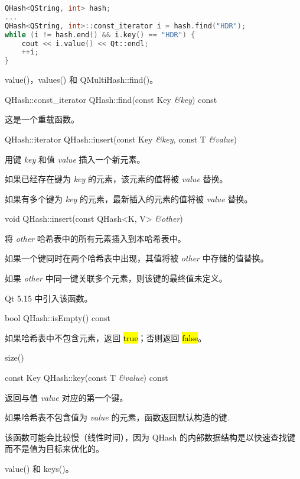 \begin{lstlisting}[language=C++]
QHash<QString, int> hash;
...
QHash<QString, int>::const_iterator i = hash.find("HDR");
while (i != hash.end() && i.key() == "HDR") {
    cout << i.value() << Qt::endl;
    ++i;
}
\end{lstlisting}

\begin{notice}[另请参阅]
value()，values() 和 QMultiHash::find()。
\end{notice}

QHash::const\_iterator QHash::find(const Key \emph{\&key}) const

这是一个重载函数。

QHash::iterator QHash::insert(const Key \emph{\&key}, const T \emph{\&value})

用键 \emph{key} 和值 \emph{value} 插入一个新元素。

如果已经存在键为 \emph{key} 的元素，该元素的值将被 \emph{value} 替换。

如果有多个键为 \emph{key} 的元素，最新插入的元素的值将被 \emph{value }替换。

void QHash::insert(const QHash<K, V> \emph{\&other})

将 \emph{other} 哈希表中的所有元素插入到本哈希表中。

如果一个键同时在两个哈希表中出现，其值将被 \emph{other} 中存储的值替换。

\begin{notice}
如果 \emph{other} 中同一键关联多个元素，则该键的最终值未定义。
\end{notice}

Qt 5.15 中引入该函数。

bool QHash::isEmpty() const

如果哈希表中不包含元素，返回 \hl{true}；否则返回 \hl{false}。

\begin{notice}[另请参阅]
size()
\end{notice}

const Key QHash::key(const T \emph{\&value}) const

返回与值 \emph{value} 对应的第一个键。

如果哈希表不包含值为 \emph{value} 的元素，函数返回默认构造的键.

该函数可能会比较慢（线性时间），因为 QHash 的内部数据结构是以快速查找键而不是值为目标来优化的。

\begin{notice}[另请参阅]
value() 和 keys()。
\end{notice}



